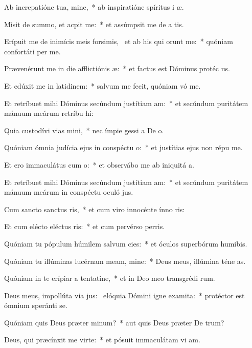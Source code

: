\item Ab increpatióne tua, mine,~* ab inspiratióne spíritus i æ.
\item Misit de summo, et acpit me:~* et assúmpsit me de a tis.
\item Erípuit me de inimícis meis forsimis,~\pscross{} et ab his qui orunt me:~* quóniam confortáti  per me.
\item Prævenérunt me in die afflictiónis æ:~* et factus est Dóminus protéc us.
\item Et edúxit me in latidinem:~* salvum me fecit, quóniam vó me.
\item Et retríbuet mihi Dóminus secúndum justítiam am:~* et secúndum puritátem mánuum meárum retríbu hi:
\item Quia custodívi vias mini,~* nec ímpie gessi a De o.
\item Quóniam ómnia judícia ejus in conspéctu o:~* et justítias ejus non répu  me.
\item Et ero immaculátus cum o:~* et observábo me ab iniquitá a.
\item Et retríbuet mihi Dóminus secúndum justítiam am:~* et secúndum puritátem mánuum meárum in conspéctu oculó jus.
\item Cum sancto sanctus ris,~* et cum viro innocénte ínno ris:
\item Et cum elécto eléctus ris:~* et cum pervérso perris.
\item Quóniam tu pópulum húmilem salvum cies:~* et óculos superbórum humibis.
\item Quóniam tu illúminas lucérnam meam, mine:~* Deus meus, illúmina téne as.
\item Quóniam in te erípiar a tentatine,~* et in Deo meo transgrédi rum.
\item Deus meus, impollúta via jus:~\pscross{} elóquia Dómini igne examita:~* protéctor est ómnium speránti  se.
\item Quóniam quis Deus præter minum?~* aut quis Deus præter De trum?
\item Deus, qui præcínxit me virte:~* et pósuit immaculátam vi am.
